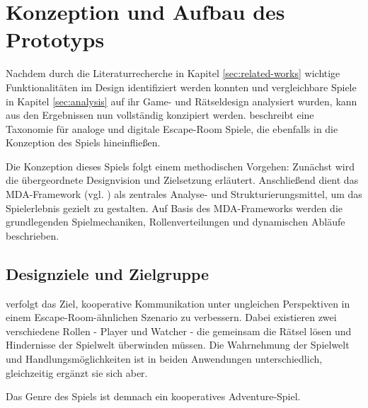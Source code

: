 \chapter{Konzeption und Aufbau des Prototyps}\label{sec:concept}

Nachdem durch die Literaturrecherche in Kapitel \ref{sec:related-works} wichtige Funktionalitäten im Design identifiziert werden konnten und vergleichbare Spiele in Kapitel \ref{sec:analysis} auf ihr Game- und Rätseldesign analysiert wurden, kann aus den Ergebnissen  nun vollständig konzipiert werden. \cite{krekhov_puzzles_2021} beschreibt eine Taxonomie für analoge und digitale Escape-Room Spiele, die ebenfalls in die Konzeption des Spiels hineinfließen.

Die Konzeption dieses Spiels folgt einem methodischen Vorgehen: Zunächst wird die übergeordnete Designvision und Zielsetzung erläutert. Anschließend dient das \ac{MDA}-Framework (vgl. \cite{hunicke_mda_2004}) als zentrales Analyse- und Strukturierungsmittel, um das Spielerlebnis gezielt zu gestalten. Auf Basis des \ac{MDA}-Frameworks werden die grundlegenden Spielmechaniken, Rollenverteilungen und dynamischen Abläufe beschrieben.



\section{Designziele und Zielgruppe}
 verfolgt das Ziel, kooperative Kommunikation unter ungleichen Perspektiven in einem Escape-Room-ähnlichen Szenario zu verbessern. Dabei existieren zwei verschiedene Rollen - Player und Watcher - die gemeinsam die Rätsel lösen und Hindernisse der Spielwelt überwinden müssen. Die Wahrnehmung der Spielwelt und Handlungsmöglichkeiten ist in beiden Anwendungen unterschiedlich, gleichzeitig ergänzt sie sich aber. 

Das Genre des Spiels ist demnach ein kooperatives Adventure-Spiel.

